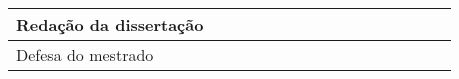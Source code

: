 \begin{table}[!ht]
\begin{tabular}{|l|l|l|l|l|l|l|l|l|l|l|l|l|l|l|l|}
	\hline
	Redação da dissertação                   &                                       &                                       &                                       &                                       &                                       &                                       &                                       &                                       &                                       &                                       &                                       &                                       & {\cellcolor[rgb]{0.396,0.396,0.396}}  & {\cellcolor[rgb]{0.396,0.396,0.396}}  &                                         \\ 
	\hline
	Defesa do mestrado                       &                                       &                                       &                                       &                                       &                                       &                                       &                                       &                                       &                                       &                                       &                                       &                                       &                                       &                                       & {\cellcolor[rgb]{0.396,0.396,0.396}}    \\
	\hline
\end{tabular}
\end{table}